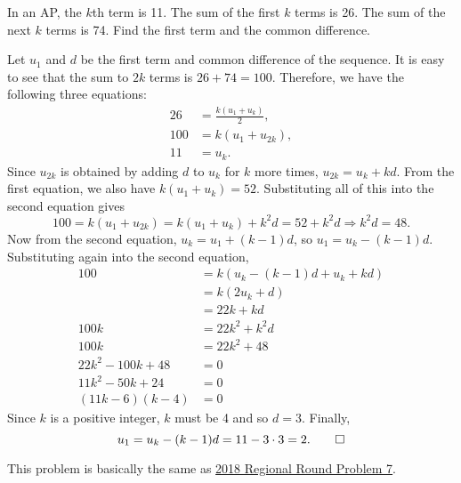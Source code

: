 \begin{question}
    In an AP, the $k$th term is 11. The sum of the first $k$ terms is 26. The
    sum of the next $k$ terms is 74. Find the first term and the common
    difference. 
\end{question}
\begin{solution}
    Let $u_1$ and $d$ be the first term and common difference of the sequence.
    It is easy to see that the sum to $2k$ terms is $26 + 74 = 100$. Therefore,
    we have the following three equations:
    \begin{align*}
        26 &= \frac{k(u_1 + u_k)}{2},\\
        100 &= k(u_1 + u_{2k}),\\
        11 &= u_k.
    \end{align*}
    Since $u_{2k}$ is obtained by adding $d$ to $u_k$ for $k$ more times,
    $u_{2k} = u_k + kd$. From the first equation, we also have $k(u_1 + u_k) =
    52$. Substituting all of this into the second equation gives
    \[ 100 = k(u_1 + u_{2k}) = k(u_1 + u_k) + k^2d = 52 + k^2d \Longrightarrow
    k^2d = 48. \]
    Now from the second equation, $u_k = u_1 + (k - 1)d$, so $u_1 = u_k - (k -
    1)d$. Substituting again into the second equation,
    \begin{align*}
        100 &= k(u_k - (k - 1)d + u_k + kd)\\
        &= k(2u_k + d)\\
        &= 22k + kd\\
        100k &= 22k^2 + k^2d\\
        100k &= 22k^2 + 48\\
        22k^2 - 100k + 48 &= 0\\
        11k^2 - 50k + 24 &= 0\\
        (11k - 6)(k - 4) &= 0
    \end{align*}
    Since $k$ is a positive integer, $k$ must be 4 and so $d = 3$. Finally, 
    \[ u_1 = u_k - (k - 1)d = 11 - 3 \cdot 3 = 2. \qedhere \]
\end{solution}
\begin{remark}
    This problem is basically the same as \hyperref[sol: 2018 Regional Round
    P7]{2018 Regional Round Problem 7}. 
\end{remark}

